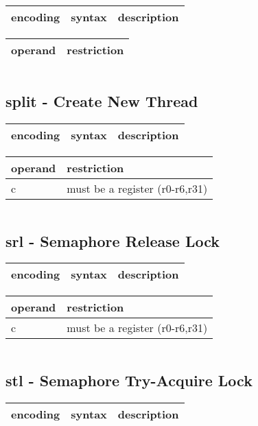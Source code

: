 \documentclass[letterpaper,10pt,openright,twoside,onecolumn]{book}
\begin{document}
  \begin{tabular}{|l|l|l|}
   \hline
    encoding & syntax & description \\
   \hline
   \hline
  \end{tabular}
  \flushleft
  \begin{tabular}{|l|l|}
   \hline
    operand & restriction \\
   \hline
   \hline
  \end{tabular}
  \begin{verbatim}
  \end{verbatim}
\newpage\subsection{split - Create New Thread}
  \begin{tabular}{|l|l|l|}
   \hline
    encoding & syntax & description \\
   \hline
   \hline
  \end{tabular}
  \flushleft
  \begin{tabular}{|l|l|}
   \hline
    operand & restriction \\
   \hline
    c & must be a register (r0-r6,r31) \\
   \hline
  \end{tabular}
  \begin{verbatim}
  \end{verbatim}
\newpage\subsection{srl - Semaphore Release Lock}
  \begin{tabular}{|l|l|l|}
   \hline
    encoding & syntax & description \\
   \hline
   \hline
  \end{tabular}
  \flushleft
  \begin{tabular}{|l|l|}
   \hline
    operand & restriction \\
   \hline
    c & must be a register (r0-r6,r31) \\
   \hline
  \end{tabular}
  \begin{verbatim}
  \end{verbatim}
\newpage\subsection{stl - Semaphore Try-Acquire Lock}
  \begin{tabular}{|l|l|l|}
   \hline
    encoding & syntax & description \\
   \hline
   \hline
  \end{tabular}
\end{document}
